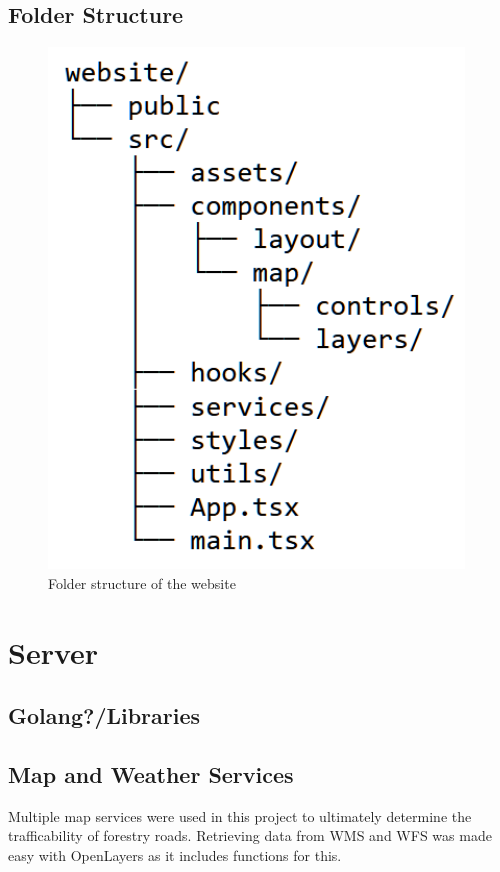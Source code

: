 \subsection{Folder Structure}
\begin{figure}[h]
    \centering
    \includegraphics[width=0.5\linewidth]{figures/website_folder_structure.pdf}
    \caption{Folder structure of the website}
    \label{fig:website_folder_structure}
\end{figure}

\section{Server}
\subsection{Golang?/Libraries}
\subsection{Map and Weather Services} %
Multiple map services were used in this project to ultimately determine the trafficability of forestry roads. Retrieving data from WMS and WFS was made easy with OpenLayers as it includes functions for this. 
